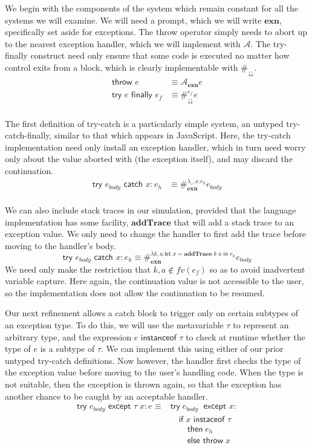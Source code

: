 \documentclass[11pt]{article}
\newcommand{\letin}[2]{\textsf{let }#1\textsf{ in }#2}
\newcommand\A{\mathcal{A}}
\begin{document}
We begin with the components of the system which remain constant for all the systems we will examine.
We will need a prompt, which we will write $\mathbf{exn}$, specifically set aside for exceptions.
The throw operator simply needs to abort up to the nearest exception handler, which we will implement with $\A$.
The try-finally construct need only ensure that some code is executed no matter how control exits from a block, which is clearly implementable with $\#_\downdownarrows$.
\begin{align*}
\textsf{throw }e &\equiv \A_\textbf{exn}e \\
\textsf{try }e\textsf{ finally }e_f &\equiv
	\#_\downdownarrows^{e_f}e \\
\end{align*}

The first definition of try-catch is a particularly simple system, an untyped try-catch-finally, similar to that which appears in JavaScript.
Here, the try-catch implementation need only install an exception handler, which in turn need worry only about the value aborted with (the exception itself), and may discard the continuation.
\begin{align*}
\textsf{try }e_{body}\textsf{ catch }x:e_h &\equiv
	\#_\textbf{exn}^{\lambda \_,x.{e_h}}e_{body}
	\\
\end{align*}

We can also include stack traces in our simulation, provided that the language implementation has some facility, $\mathbf{addTrace}$ that will add a stack trace to an exception value.
We only need to change the handler to first add the trace before moving to the handler's body.
$$\textsf{try }e_{body}\textsf{ catch }x:e_h \equiv
	\#_\textbf{exn}^{\lambda k,a.{\letin{x=\mathbf{addTrace}\;k\;a}{e_h}}}e_{body}$$
We need only make the restriction that $k,a \notin fv(e_f)$ so as to avoid inadvertent variable capture.
Here again, the continuation value is not accessible to the user, so the implementation does not allow the continuation to be resumed.

Our next refinement allows a catch block to trigger only on certain subtypes of an exception type.
To do this, we will use the metavariable $\tau$ to represent an arbitrary type, and the expression $e\textsf{ instanceof }\tau$ to check at runtime whether the type of $e$ is a subtype of $\tau$.
We can implement this using either of our prior untyped try-catch definitions.
Now however, the handler first checks the type of the exception value before moving to the user's handling code.
When the type is not suitable, then the exception is thrown again, so that the exception has another chance to be caught by an acceptable handler.
\begin{align*}
\textsf{try }e_{body}\textsf{ except }\tau\;x:e \equiv{}
	&\textsf{try}\;e_{body}\;\textsf{ except }x: \\
	&\quad\textsf{if}\;x\textsf{ instaceof }\tau\\
	&\qquad\textsf{then}\;e_h \\
	&\qquad\textsf{else throw}\;x \\
\end{align*}
\end{document}
